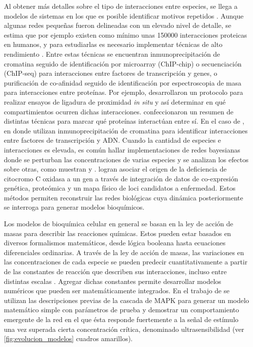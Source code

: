 Al obtener más detalles sobre el tipo de interacciones entre especies, se llega a modelos de sistemas en los que es posible identificar motivos repetidos \citep{Tyson2003}. Aunque algunas redes pequeñas fueron delineadas con un elevado nivel de detalle, se estima que por ejemplo existen como mínimo unas 150000 interacciones proteicas en humanos, y para estudiarlas es necesario implementar técnicas de alto rendimiento \citep{Han2008}. Entre estas técnicas se encuentran inmunoprecipitación de cromatina seguido de identificación por microarray (ChIP-chip) o secuenciación (ChIP-seq) para interacciones entre factores de transcripción y genes, o purificación de co-afinidad seguido de identificación por espectroscopia de masa para interacciones entre proteínas. Por ejemplo, \cite{Soderberg2008} desarrollaron un protocolo para realizar ensayos de ligadura de proximidad \textit{in situ} y así determinar en qué compartimientos ocurren dichas interacciones. \cite{Berggard2007} confeccionaron un resumen de distintas técnicas para marcar qué proteínas interactúan entre sí. En el caso de \cite{Kang2020}, en donde utilizan inmunoprecipitación de cromatina para identificar interacciones entre factores de transcripción y ADN. Cuando la cantidad de especies e interacciones es elevada, es común hallar implementaciones de redes bayesianas donde se perturban las concentraciones de varias especies y se analizan los efectos sobre otras, como muestran \cite{Xu2010} y \cite{Sachs2005}. \cite{Mootha2003} logran asociar el origen de la deficiencia de citocromo C oxidasa a un gen a través de integración de datos de co-expresión genética, proteómica y un mapa físico de loci candidatos a enfermedad. Estos métodos permiten reconstruir las redes biológicas cuya dinámica posteriormente se interroga para generar modelos bioquímicos.

Los modelos de bioquímica celular en general se basan en la ley de acción de masas para describir las reacciones químicas. Estos pueden estar basados en diversos formalismos matemáticos, desde lógica booleana hasta ecuaciones diferenciales ordinarias. A través de la ley de acción de masas, las variaciones en las concentraciones de cada especie se pueden predecir cuantitativamente a partir de las constantes de reacción que describen sus interacciones, incluso entre distintas escalas \citep{Krakauer2011}. Agregar dichas constantes permite desarrollar modelos numéricos que pueden ser matemáticamente integrados. En el trabajo de \cite{Huang1996} se utilizan las descripciones previas de la cascada de MAPK para generar un modelo matemático simple con parámetros de prueba y demostrar un comportamiento emergente de la red en el que ésta responde fuertemente a la señal de estímulo una vez superada cierta concentración crítica, denominado ultrasensibilidad (ver \cref{fig:evolucion_modelos} cuadros amarillos).

